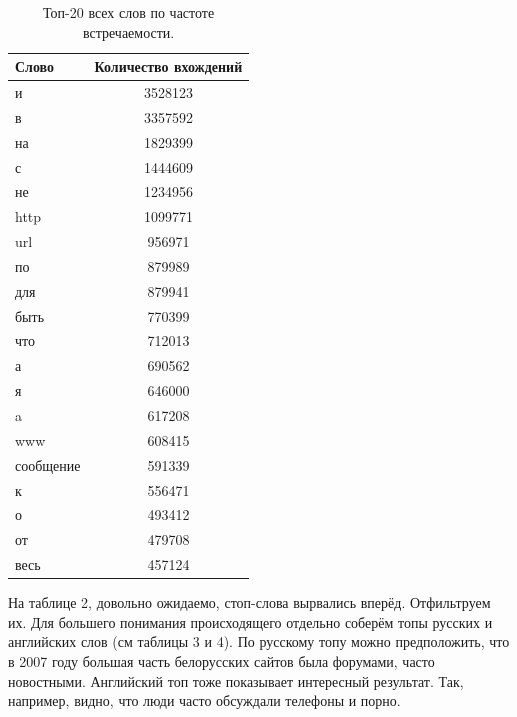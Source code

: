 \begin{table}
	\begin{center}
		\begin{tabular}{|l|c|}
			\hline
			Слово & Количество вхождений\\
			\hline
			и & 3528123 \\
			в &3357592\\
			на &1829399\\
			с &1444609\\
			не &1234956\\
			http& 1099771\\
			url &956971\\
			по &879989\\
			для& 879941\\
			быть& 770399\\
			что &712013\\
			а &690562\\
			я &646000\\
			a &617208\\
			www &608415\\
			сообщение &591339\\
			к &556471\\
			о &493412\\
			от& 479708\\
			весь& 457124\\
			\hline
		\end{tabular}
	\end{center}
	\caption{Топ-20 всех слов по частоте встречаемости.}
\end{table}

На таблице 2, довольно ожидаемо, стоп-слова вырвались вперёд. Отфильтруем их.
Для большего понимания происходящего отдельно соберём топы русских и английских слов (см таблицы 3 и 4). По русскому топу можно предположить, что в 2007 году большая часть белорусских сайтов была форумами, часто новостными. Английский топ тоже показывает интересный результат. Так, например, видно, что люди часто обсуждали телефоны и порно. 

